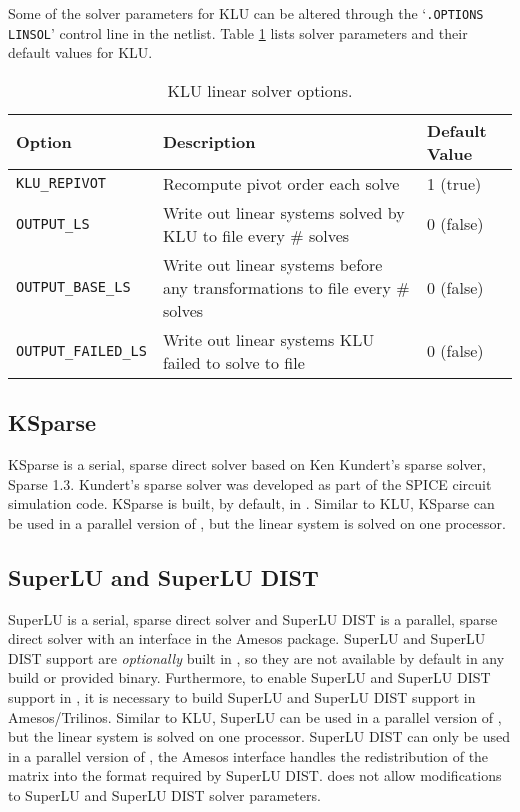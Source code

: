 Some of the solver parameters for KLU can be altered through the `\texttt{.OPTIONS LINSOL}' control line in the netlist.  
Table \ref{tab:klu:options} lists solver parameters and their default values for KLU.
   
\begin{table}[htp]
\caption[ KLU linear solver options.] {KLU linear solver options.}
\label{tab:klu:options}
\begin{center}
\begin{tabular}{| p{3.5cm} | p{9cm} | p{2.5cm} |}
\hline
Option & Description & Default Value \\
\hline
{\tt KLU\_REPIVOT}         & Recompute pivot order each solve & 1 (true) \\
{\tt OUTPUT\_LS}           & Write out linear systems solved by KLU to file every \# solves & 0 (false)\\
{\tt OUTPUT\_BASE\_LS}     & Write out linear systems before any transformations to file every \# solves & 0 (false)\\
{\tt OUTPUT\_FAILED\_LS}   & Write out linear systems KLU failed to solve to file & 0 (false) \\
\hline
\end{tabular}
\end{center}
\end{table}

\subsection{KSparse}
KSparse is a serial, sparse direct solver based on Ken Kundert's sparse solver, Sparse 1.3.  Kundert's sparse solver was developed 
as part of the SPICE circuit simulation code.  KSparse is built, by default, in \Xyce{}.  Similar to KLU,
KSparse can be used in a parallel version of \Xyce{}, but the linear system is solved on one processor.

\subsection{SuperLU and SuperLU DIST}
SuperLU is a serial, sparse direct solver and SuperLU DIST is a parallel, sparse direct solver with an interface in the 
Amesos package.  SuperLU and SuperLU DIST support are {\it optionally} built in \Xyce{},
so they are not available by default in any \Xyce{} build or provided binary.  Furthermore, to enable SuperLU and 
SuperLU DIST support in \Xyce{}, it is necessary to build SuperLU and SuperLU DIST support in Amesos/Trilinos.  Similar to KLU, 
SuperLU can be used in a parallel version of \Xyce{}, but the linear system is 
solved on one processor.  SuperLU DIST can only be used in a parallel version of \Xyce{}, the Amesos interface handles the redistribution
of the matrix into the format required by SuperLU DIST.  
\Xyce{} does not allow modifications to SuperLU and SuperLU DIST solver parameters. 


